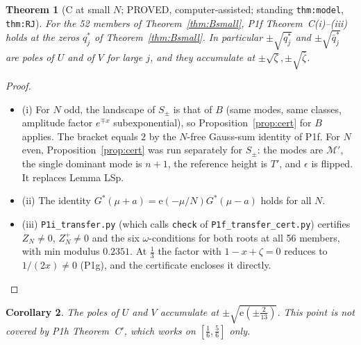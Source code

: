 \documentclass[11pt]{article}
\newtheorem{theorem}{Theorem}\newtheorem{lemma}[theorem]{Lemma}\newtheorem{proposition}[theorem]{Proposition}
\newtheorem{corollary}[theorem]{Corollary}
\theoremstyle{remark}\newtheorem{remark}[theorem]{Remark}
\newcommand{\e}{\mathrm{e}}
\begin{document}
\begin{theorem}[C at small $N$; PROVED, computer-assisted; standing \texttt{thm:model}, \texttt{thm:RJ}]\label{thm:Csmall}
For the 52 members of Theorem~\ref{thm:Bsmall}, P1f Theorem~C(i)--(iii) holds at the zeros $q^*_j$ of Theorem~\ref{thm:Bsmall}. In particular $\pm\sqrt{q^*_j}$ and $\pm\sqrt{\bar q^*_j}$ are poles of $U$ and of $V$ for large $j$, and they accumulate at $\pm\sqrt\zeta,\pm\sqrt{\bar\zeta}$.
\end{theorem}
\begin{proof}
\begin{itemize}
\item (i) For $N$ odd, the landscape of $S_\pm$ is that of $B$ (same modes, same classes, amplitude factor $e^{\mp x}$ subexponential), so Proposition~\ref{prop:cert} for $B$ applies. The bracket equals $2$ by the $N$-free Gauss-sum identity of P1f.
 For $N$ even, Proposition~\ref{prop:cert} was run separately for $S_\pm$: the modes are $\mathcal M'$, the single dominant mode is $n+1$, the reference height is $T'$, and $\epsilon$ is flipped. It replaces Lemma LSp.
\item (ii) The identity $G^*(\mu+a)=\e(-\mu/N)G^*(\mu-a)$ holds for all $N$.
\item (iii) \texttt{P1i\_transfer.py} (which calls \texttt{check} of \texttt{P1f\_transfer\_cert.py}) certifies $Z_N\ne0$, $Z^+_N\ne0$ and the six $\omega$-conditions for both roots at all 56 members, with min modulus $0.2351$. At $\frac13$ the factor with $1-x+\zeta=0$ reduces to $1/(2x)\ne0$ (P1g), and the certificate encloses it directly.
\end{itemize}
\end{proof}

\begin{corollary}\label{cor:213}
The poles of $U$ and $V$ accumulate at $\pm\sqrt{\e(\pm\frac2{13})}$. This point is not covered by P1h Theorem~C$'$, which works on $[\frac16,\frac56]$ only.
\end{corollary}
\end{document}
